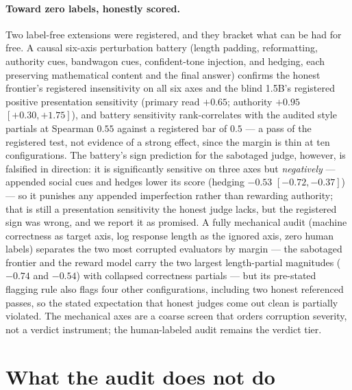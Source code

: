 \documentclass[11pt]{article}
\begin{document}
\paragraph{Toward zero labels, honestly scored.}
Two label-free extensions were registered, and they bracket what can be had for free.
A causal six-axis perturbation battery (length padding, reformatting, authority cues, bandwagon cues, confident-tone injection, and hedging, each preserving mathematical content and the final answer) confirms the honest frontier's registered insensitivity on all six axes and the blind 1.5B's registered positive presentation sensitivity (primary read $+0.65$; authority $+0.95$ $[+0.30, +1.75]$), and battery sensitivity rank-correlates with the audited style partials at Spearman $0.55$ against a registered bar of $0.5$ --- a pass of the registered test, not evidence of a strong effect, since the margin is thin at ten configurations.
The battery's sign prediction for the sabotaged judge, however, is falsified in direction: it is significantly sensitive on three axes but \emph{negatively} --- appended social cues and hedges lower its score (hedging $-0.53$ $[-0.72, -0.37]$) --- so it punishes any appended imperfection rather than rewarding authority; that is still a presentation sensitivity the honest judge lacks, but the registered sign was wrong, and we report it as promised.
A fully mechanical audit (machine correctness as target axis, log response length as the ignored axis, zero human labels) separates the two most corrupted evaluators by margin --- the sabotaged frontier and the reward model carry the two largest length-partial magnitudes ($-0.74$ and $-0.54$) with collapsed correctness partials --- but its pre-stated flagging rule also flags four other configurations, including two honest referenced passes, so the stated expectation that honest judges come out clean is partially violated.
The mechanical axes are a coarse screen that orders corruption severity, not a verdict instrument; the human-labeled audit remains the verdict tier.

\section{What the audit does not do}
\label{sec:limits}
\end{document}
